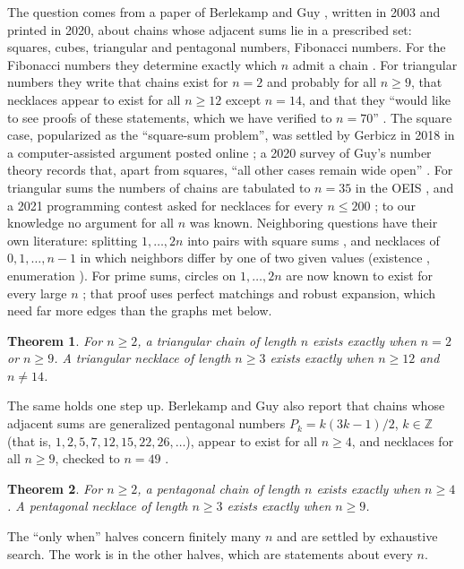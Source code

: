 \documentclass[11pt]{article}
\newtheorem{theorem}{Theorem}
\theoremstyle{definition}
\theoremstyle{remark}
\begin{document}
The question comes from a paper of Berlekamp and Guy \cite{BG}, written in 2003 and printed in
2020, about chains whose adjacent sums lie in a prescribed set: squares, cubes, triangular and
pentagonal numbers, Fibonacci numbers. For the Fibonacci numbers they determine exactly which $n$ admit a chain \cite[Theorem~1]{BG}. For
triangular numbers they write that chains exist for $n=2$ and probably for all $n\ge 9$, that
necklaces appear to exist for all $n\ge12$ except $n=14$, and that they ``would like to see proofs
of these statements, which we have verified to $n=70$'' \cite[p.~343]{BG}. The square case,
popularized as the ``square-sum problem'', was settled by Gerbicz in 2018 in a computer-assisted
argument posted online \cite{Gerbicz,A090461}; a 2020 survey of Guy's number theory records that,
apart from squares, ``all other cases remain wide open'' \cite{JW}. For triangular sums the
numbers of chains are tabulated to $n=35$ in the OEIS \cite{A116980}, and a 2021 programming
contest asked for necklaces for every $n\le200$ \cite{topcoder}; to our knowledge no argument for all $n$ was known.
Neighboring questions have their own literature: splitting $1,\dots,2n$ into pairs with square sums
\cite{HKP}, and necklaces of $0,1,\dots,n-1$ in which neighbors differ by one of two given values (existence \cite{WGS}, enumeration \cite{WGS2}).
For prime sums, circles on $1,\dots,2n$ are now known to exist for every large $n$ \cite{She}; that
proof uses perfect matchings and robust expansion, which need far more edges than the graphs met below.

\begin{theorem}\label{thm:main}
For $n\ge2$, a triangular chain of length $n$ exists exactly when $n=2$ or $n\ge 9$. A triangular necklace of
length $n\ge3$ exists exactly when $n\ge 12$ and $n\ne 14$.
\end{theorem}

The same holds one step up. Berlekamp and Guy also report that chains whose adjacent sums are
generalized pentagonal numbers $P_k=k(3k-1)/2$, $k\in\mathbb Z$ (that is, $1,2,5,7,12,15,22,26,\dots$),
appear to exist for all $n\ge4$, and necklaces for all $n\ge9$, checked to $n=49$ \cite[pp.~344--345]{BG}.

\begin{theorem}\label{thm:pent}
For $n\ge2$, a pentagonal chain of length $n$ exists exactly when $n\ge4$. A pentagonal necklace of
length $n\ge3$ exists exactly when $n\ge9$.
\end{theorem}

The ``only when'' halves concern finitely many $n$ and are settled by exhaustive search. The work
is in the other halves, which are statements about every $n$.
\end{document}
